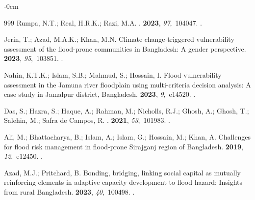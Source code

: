 \documentclass[water,article,accept,pdftex,oneauhor]{Definitions/mdpi}
\begin{document}
{{{\begin{adjustwidth}{-\extralength}{0cm}
\begin{thebibliography}{999}
Rumpa, N.T.; Real, H.R.K.; Razi, M.A.
.
 {\bf 2023}, {\em 97},~104047.
.

Jerin, T.; Azad, M.A.K.; Khan, M.N.
\newblock Climate change-triggered vulnerability assessment of the flood-prone
  communities in Bangladesh: A gender perspective.
 {\bf 2023}, {\em 95},~103851.
.

Nahin, K.T.K.; Islam, S.B.; Mahmud, S.; Hossain, I.
\newblock Flood vulnerability assessment in the Jamuna river floodplain using
  multi-criteria decision analysis: A case study in Jamalpur district,
  Bangladesh.
 {\bf 2023}, {\em 9},~e14520.
.

Das, S.; Hazra, S.; Haque, A.; Rahman, M.; Nicholls, R.J.; Ghosh, A.; Ghosh,
  T.; Salehin, M.; {Safra de Campos}, R.
.
 {\bf 2021}, {\em 53},~101983.
.

Ali, M.; Bhattacharya, B.; Islam, A.; Islam, G.; Hossain, M.; Khan, A.
\newblock Challenges for flood risk management in flood-prone Sirajganj region
  of Bangladesh.
 {\bf 2019}, {\em 12},~e12450.
.

Azad, M.J.; Pritchard, B.
\newblock Bonding, bridging, linking social capital as mutually reinforcing
  elements in adaptive capacity development to flood hazard: Insights from
  rural Bangladesh.
 {\bf 2023}, {\em 40},~100498.
.


\end{thebibliography}
\end{adjustwidth}}}}
\end{document}

